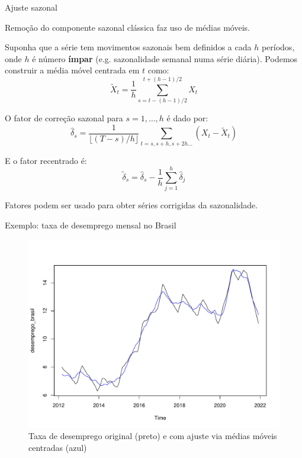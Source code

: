 \documentclass[11pt]{beamer}
\newenvironment{halfwideitemize}{\itemize\addtolength{\itemsep}{0.5em}}{\enditemize}
\begin{document}
\begin{frame}{Ajuste sazonal}
	\begin{halfwideitemize}
		\item Remoção do componente sazonal clássica faz uso de {\color{blue}médias móveis}.
		\item Suponha que a série tem movimentos sazonais bem definidos a cada $h$ períodos, onde $h$ é número \textbf{ímpar} (e.g. sazonalidade semanal numa série diária). Podemos construir a {\color{blue} média móvel centrada em $t$} como:
		\begin{equation}
			\tilde{X}_t = \frac{1}{h}\sum_{s = t - (h-1)/2}^{t+(h-1)/2} X_t
		\end{equation}
		\item O {\color{blue}fator de correção sazonal} para $s=1,\ldots, h$ é dado por:
		\begin{equation}
			\hat{\delta}_s = \frac{1}{\lfloor (T - s)/h\rfloor}\sum_{t = s, s + h, s+ 2h \ldots} (X_t - \tilde{X}_t)
		\end{equation}
		\item E o fator recentrado é:
		\begin{equation}
			\tilde{\delta}_s = \hat{\delta}_s - \frac{1}{h}\sum_{j=1}^h \hat{\delta}_j		
		\end{equation}
		\item Fatores podem ser usado para obter séries corrigidas da sazonalidade.
		
	\end{halfwideitemize}
	
\end{frame}

\begin{frame}{Exemplo: taxa de desemprego mensal no Brasil}
	\begin{figure}
		\caption{Taxa de desemprego original (preto) e com ajuste via médias móveis centradas (azul)}
		\includegraphics[scale=0.4]{graficos/desemprego_mm.pdf}
	\end{figure}
\end{frame}
\end{document}
